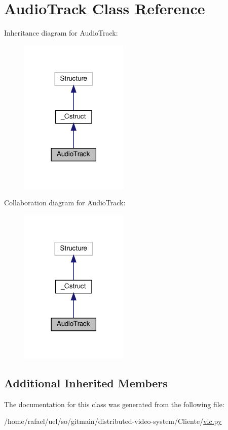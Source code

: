 \hypertarget{classvlc_1_1_audio_track}{}\section{Audio\+Track Class Reference}
\label{classvlc_1_1_audio_track}


Inheritance diagram for Audio\+Track\+:
\nopagebreak
\begin{figure}[H]
\begin{center}
\leavevmode
\includegraphics[width=146pt]{classvlc_1_1_audio_track__inherit__graph}
\end{center}
\end{figure}


Collaboration diagram for Audio\+Track\+:
\nopagebreak
\begin{figure}[H]
\begin{center}
\leavevmode
\includegraphics[width=146pt]{classvlc_1_1_audio_track__coll__graph}
\end{center}
\end{figure}
\subsection*{Additional Inherited Members}


The documentation for this class was generated from the following file\+:\begin{DoxyCompactItemize}
\item 
/home/rafael/uel/so/gitmain/distributed-\/video-\/system/\+Cliente/\hyperlink{vlc_8py}{vlc.\+py}\end{DoxyCompactItemize}
